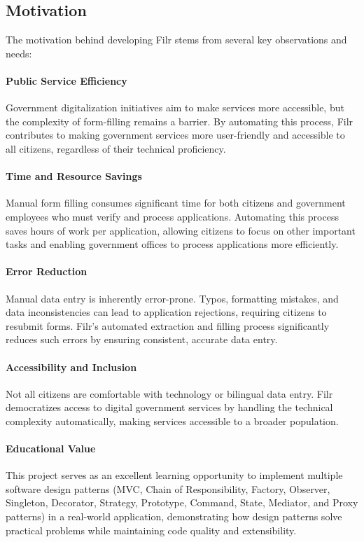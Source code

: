 \documentclass[11pt, a4paper]{article}
\theoremstyle{plain}
\theoremstyle{definition}
\begin{document}
\subsection{Motivation}

The motivation behind developing Filr stems from several key observations and needs:

\paragraph{Public Service Efficiency}
Government digitalization initiatives aim to make services more accessible, but the complexity of form-filling remains a barrier. By automating this process, Filr contributes to making government services more user-friendly and accessible to all citizens, regardless of their technical proficiency.

\paragraph{Time and Resource Savings}
Manual form filling consumes significant time for both citizens and government employees who must verify and process applications. Automating this process saves hours of work per application, allowing citizens to focus on other important tasks and enabling government offices to process applications more efficiently.

\paragraph{Error Reduction}
Manual data entry is inherently error-prone. Typos, formatting mistakes, and data inconsistencies can lead to application rejections, requiring citizens to resubmit forms. Filr's automated extraction and filling process significantly reduces such errors by ensuring consistent, accurate data entry.

\paragraph{Accessibility and Inclusion}
Not all citizens are comfortable with technology or bilingual data entry. Filr democratizes access to digital government services by handling the technical complexity automatically, making services accessible to a broader population.

\paragraph{Educational Value}
This project serves as an excellent learning opportunity to implement multiple software design patterns (MVC, Chain of Responsibility, Factory, Observer, Singleton, Decorator, Strategy, Prototype, Command, State, Mediator, and Proxy patterns) in a real-world application, demonstrating how design patterns solve practical problems while maintaining code quality and extensibility.
\end{document}
